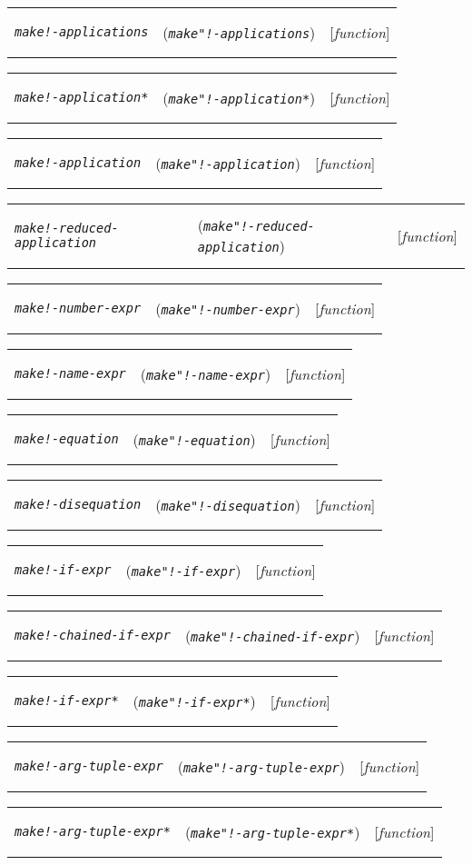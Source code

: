 \documentclass[12pt]{book}
\makeatletter
\def\amprest{{\smaller\sc {\smaller\smaller \&}rest\ }}
\newcommand{\functionnm}[1]{\texttt{\textit{#1}}}
\newenvironment{functioni}[3]%
{\par\noindent\begin{boxedminipage}{\textwidth}%
 \par\noindent\begin{tabularx}{\linewidth}{lXr}%
 \hypertarget{#1}{\functionnm{#1}}\index{#2@\functionnm{#2}|underline}%
   &(\texttt{\textit{#2}})&[\emph{function}]%
 \end{tabularx}\par}
{\end{boxedminipage}}
\makeatother
\begin{document}
\begin{functioni}{make!-applications}{make"!-applications}{op args-list}
\end{functioni}

\begin{functioni}{make!-application*}{make"!-application*}{op arguments}
\end{functioni}

\begin{functioni}{make!-application}{make"!-application}{op \amprest args}
\end{functioni}

\begin{functioni}{make!-reduced-application}{make"!-reduced-application}{op arg}
\end{functioni}

\begin{functioni}{make!-number-expr}{make"!-number-expr}{number}
\end{functioni}

\begin{functioni}{make!-name-expr}{make"!-name-expr}{id actuals mod-id res}
\end{functioni}
    
\begin{functioni}{make!-equation}{make"!-equation}{lhs rhs}
\end{functioni}

\begin{functioni}{make!-disequation}{make"!-disequation}{lhs rhs}
\end{functioni}

\begin{functioni}{make!-if-expr}{make"!-if-expr}{cond then else}
\end{functioni}

\begin{functioni}{make!-chained-if-expr}{make"!-chained-if-expr}{cond then else}
\end{functioni}

\begin{functioni}{make!-if-expr*}{make"!-if-expr*}{cond then else chained?}
\end{functioni}

\begin{functioni}{make!-arg-tuple-expr}{make"!-arg-tuple-expr}{\amprest args}
\end{functioni}

\begin{functioni}{make!-arg-tuple-expr*}{make"!-arg-tuple-expr*}{args}
\end{functioni}
\end{document}
